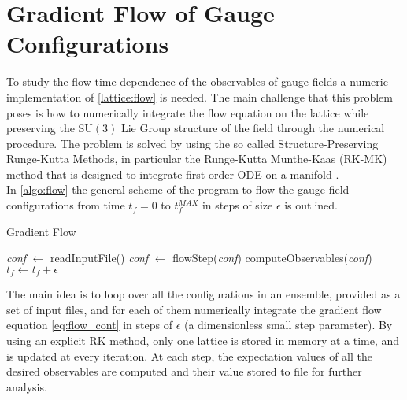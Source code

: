 \section{Gradient Flow of Gauge Configurations}
To study the flow time dependence of the observables of gauge fields a numeric implementation of \cref{lattice:flow} is needed. The main challenge that this problem poses is how to numerically integrate the flow equation on the lattice while preserving the $\mathrm{SU}(3)$ Lie Group structure of the field through the numerical procedure. The problem is solved by using the so called Structure-Preserving Runge-Kutta Methods, in particular the Runge-Kutta Munthe-Kaas (RK-MK) method that is designed to integrate first order ODE on a manifold \cite{munthe-kaas_runge-kutta_1998,munthe-kaas_lie-butcher_1995,celledoni_introduction_2014}. \\
In \cref{algo:flow} the general scheme of the program to flow the gauge field configurations from time $t_f=0$ to $t_f^{MAX}$ in steps of size $\epsilon$ is outlined.
\begin{algorithm}[bht!]
    \caption{Gradient Flow}\label{algo:flow}
    \begin{algorithmic}[1]
        \State \textit{conf} $\gets$ readInputFile()     
            \State \textit{conf} $\gets $ flowStep(\textit{conf})
            \State computeObservables(\textit{conf}) 
            \State $t_f \gets  t_f + \epsilon$
        \EndFor
    \EndFor
\end{algorithmic}
\end{algorithm}

The main idea is to loop over all the configurations in an ensemble, provided as a set of input files, and for each of them numerically integrate the gradient flow equation \cref{eq:flow_cont} in steps of $\epsilon$ (a dimensionless small step parameter). By using an explicit RK method, only one lattice is stored in memory at a time, and is updated at every iteration. At each step, the expectation values of all the desired observables are computed and their value stored to file for further analysis.

